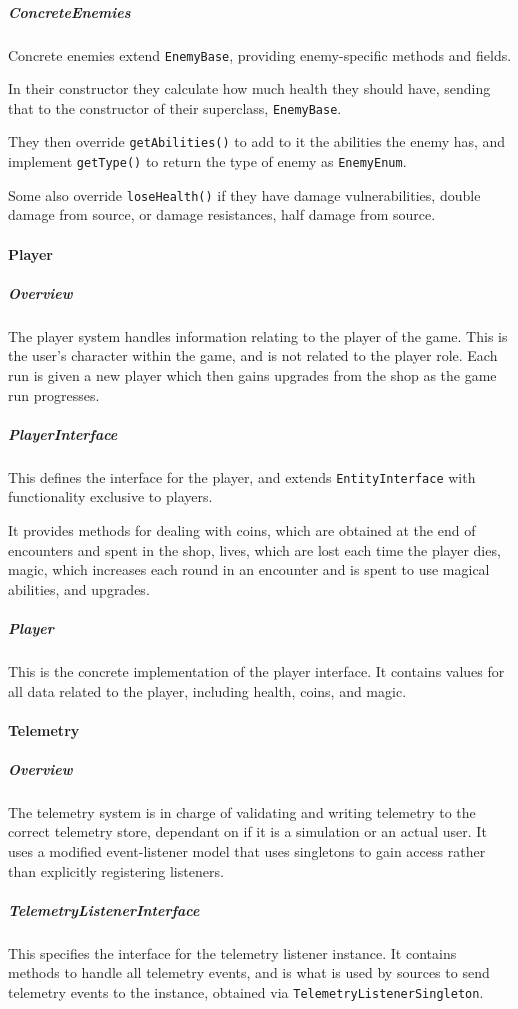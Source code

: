 \subparagraph{ConcreteEnemies}
Concrete enemies extend \texttt{EnemyBase}, providing enemy-specific methods and fields.

In their constructor they calculate how much health they should have, sending that to the constructor of their superclass, \texttt{EnemyBase}.

They then override \texttt{getAbilities()} to add to it the abilities the enemy has, and implement \texttt{getType()} to return the type of enemy as \texttt{EnemyEnum}.

Some also override \texttt{loseHealth()} if they have damage vulnerabilities, double damage from source, or damage resistances, half damage from source.

\paragraph{Player}

\subparagraph{Overview}
The player system handles information relating to the player of the game. This is the user's character within the game, and is not related to the player role. Each run is given a new player which then gains upgrades from the shop as the game run progresses.

\subparagraph{PlayerInterface}
This defines the interface for the player, and extends \texttt{EntityInterface} with functionality exclusive to players.

It provides methods for dealing with coins, which are obtained at the end of encounters and spent in the shop, lives, which are lost each time the player dies, magic, which increases each round in an encounter and is spent to use magical abilities, and upgrades.

\subparagraph{Player}
This is the concrete implementation of the player interface. It contains values for all data related to the player, including health, coins, and magic.

\paragraph{Telemetry}

\subparagraph{Overview}
The telemetry system is in charge of validating and writing telemetry to the correct telemetry store, dependant on if it is a simulation or an actual user. It uses a modified event-listener model that uses singletons to gain access rather than explicitly registering listeners.

\subparagraph{TelemetryListenerInterface}
This specifies the interface for the telemetry listener instance. It contains methods to handle all telemetry events, and is what is used by sources to send telemetry events to the instance, obtained via \texttt{TelemetryListenerSingleton}.

